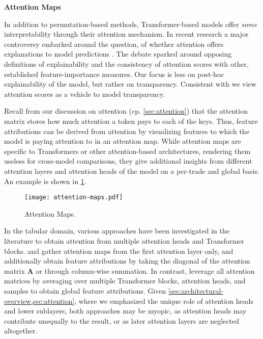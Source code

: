 \textbf{Attention Maps}

In addition to permutation-based methods, Transformer-based models offer \emph{some} interpretability through their attention mechanism. In recent research a major controversy embarked around the question, of whether attention offers explanations to model predictions \autocites[cp.][150]{bastingsElephantInterpretabilityRoom2020}[][5--7]{jainAttentionNotExplanation2019}[][9]{wiegreffeAttentionNotNot2019}. The debate sparked around opposing definitions of explainability and the consistency of attention scores with other, established feature-importance measures. Our focus is less on post-hoc explainability of the model, but rather on transparency. Consistent with \textcite[][8]{wiegreffeAttentionNotNot2019} we view attention scores as a vehicle to model transparency.

Recall from our discussion on attention (cp. \cref{sec:attention}) that the attention matrix stores how much attention a token pays to each of the keys. Thus, feature attributions can be derived from attention by visualizing features to which the model is paying attention to in an attention map. While attention maps are specific to Transformers or other attention-based architectures, rendering them useless for cross-model comparisons, they give additional insights from different attention layers and attention heads of the model on a per-trade and global basis. An example is shown in \cref{fig:attention-maps}.

\begin{figure}[ht]
    \centering
    \texttt{[image: attention-maps.pdf]}
    \caption[Attention Maps]{Attention Maps.}
    \label{fig:attention-maps}
\end{figure}

In the tabular domain, various approaches have been investigated in the literature to obtain attention from multiple attention heads and Transformer blocks. \textcite[][18]{somepalliSaintImprovedNeural2021} and \textcite[][11]{borisovDeepNeuralNetworks2022} gather attention maps from the first attention layer only, and \textcite[][11]{borisovDeepNeuralNetworks2022} additionally obtain feature attributions by taking the diagonal of the attention matrix $\mathbf{A}$ or through column-wise summation. In contrast, \textcite[][10]{gorishniyRevisitingDeepLearning2021} leverage all attention matrices by averaging over multiple Transformer blocks, attention heads, and samples to obtain global feature attributions. Given \cref{sec:architectural-overview,sec:attention}, where we emphasized the unique role of attention heads and lower sublayers, both approaches may be myopic, as attention heads may contribute unequally to the result, or as later attention layers are neglected altogether.

